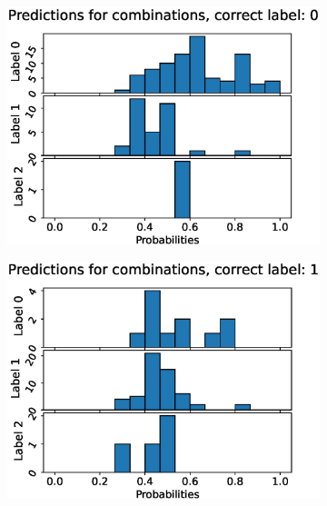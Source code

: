\begin{figure}
  \centering
  \begin{subfigure}[t]{0.33\textwidth}
    \includegraphics[width=\textwidth]{files/figs/res/trunk/pc0.eps}
    \caption{}
    \label{fig:trunk-pc0}
  \end{subfigure}%
  \begin{subfigure}[t]{0.33\textwidth}
    \includegraphics[width=\textwidth]{files/figs/res/trunk/pc1.eps}
    \caption{}
    \label{fig:trunk-pc1}
  \end{subfigure}%
  \begin{subfigure}[t]{0.33\textwidth}

\end{subfigure}
\end{figure}
